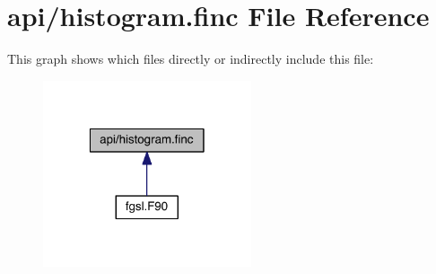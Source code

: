 \hypertarget{histogram_8finc}{\section{api/histogram.finc File Reference}
\label{histogram_8finc}
}
This graph shows which files directly or indirectly include this file\-:
\nopagebreak
\begin{figure}[H]
\begin{center}
\leavevmode
\includegraphics[width=174pt]{histogram_8finc__dep__incl}
\end{center}
\end{figure}
